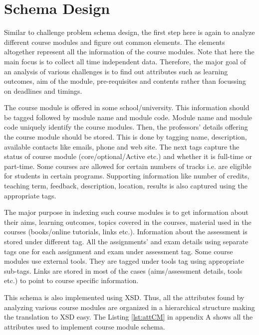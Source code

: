 \documentclass[11pt,letterpaper]{report}
\begin{document}
\section{Schema Design}
Similar to challenge problem schema design, the first step here is again to analyze different course modules and figure out common elements. The elements altogether represent all the information of the course modules. Note that here the main focus is to collect all time independent data. Therefore, the major goal of an analysis of various challenges is to find out attributes such as learning outcomes, aim of the module, pre-requisites and contents rather than focussing on deadlines and timings.  

The course module is offered in some school/university. This information should be tagged followed by module name and module code. Module name and module code uniquely identify the course modules. Then, the professors' details offering the course module should be stored. This is done by tagging name, description, available contacts like emails, phone and web site. The next tags capture the status of course module (core/optional/Active etc.) and whether it is full-time or part-time. Some courses are allowed for certain numbers of tracks i.e. are eligible for students in certain programs. Supporting information like number of credits, teaching term, feedback, description, location, results is also captured using the appropriate tags. 

The major purpose in indexing such course modules is to get information about their aims, learning outcomes, topics covered in the courses, material used in the courses (books/online tutorials, links etc.). Information about the assessment is stored under different tag. All the assignments' and exam details using separate tags one for each assignment and exam under assessment tag. Some course modules use external tools. They are tagged under tools tag using appropriate sub-tags. Links are stored in most of the cases (aims/assessment details, tools etc.) to point to course specific information.     
 
This schema is also implemented using XSD. Thus, all the attributes found by analyzing various course modules are organized in a hierarchical structure making the translation to XSD easy. The Listing \ref{lst:attCM} in appendix A shows all the attributes used to implement course module schema.
\end{document}

